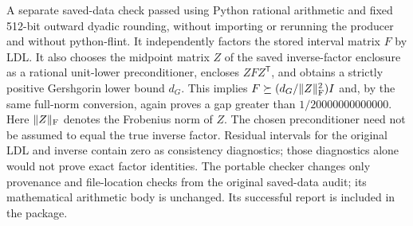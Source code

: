 A separate saved-data check passed using Python rational arithmetic and fixed 512-bit outward dyadic rounding, without importing or rerunning the producer and without python-flint. It independently factors the stored interval matrix $F$ by LDL. It also chooses the midpoint matrix $Z$ of the saved inverse-factor enclosure as a rational unit-lower preconditioner, encloses $ZFZ^{\mathsf T}$, and obtains a strictly positive Gershgorin lower bound $d_G$. This implies $F\succeq(d_G/\lVert Z\rVert_{\mathrm F}^2)I$ and, by the same full-norm conversion, again proves a gap greater than $1/20000000000000$. Here $\lVert Z\rVert_{\mathrm F}$ denotes the Frobenius norm of $Z$. The chosen preconditioner need not be assumed to equal the true inverse factor. Residual intervals for the original LDL and inverse contain zero as consistency diagnostics; those diagnostics alone would not prove exact factor identities. The portable checker changes only provenance and file-location checks from the original saved-data audit; its mathematical arithmetic body is unchanged. Its successful report is included in the package.
